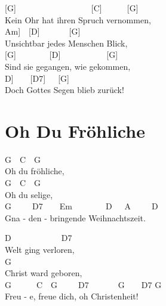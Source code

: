 \documentclass[
  letterpaper,
  twoside=false]{scrbook}
\begin{document}
{[}G{]}~~~~~~~~~~~~~~~~~~{[}C{]}~~~~~~{[}G{]}\\
Kein Ohr hat ihren Spruch vernommen,\\
\hspace*{0.333em}\hspace*{0.333em}\hspace*{0.333em}\hspace*{0.333em}\hspace*{0.333em}\hspace*{0.333em}\hspace*{0.333em}\hspace*{0.333em}\hspace*{0.333em}\hspace*{0.333em}\hspace*{0.333em}{[}Am{]}~~{[}D{]}~~~~~~~{[}G{]}\\
Unsichtbar jedes Menschen Blick,\\
{[}G{]}~~~~~~~~{[}D{]}~~~~~~~~~~~{[}G{]}\\
Sind sie gegangen, wie gekommen,\\
\hspace*{0.333em}\hspace*{0.333em}\hspace*{0.333em}\hspace*{0.333em}\hspace*{0.333em}\hspace*{0.333em}\hspace*{0.333em}\hspace*{0.333em}\hspace*{0.333em}\hspace*{0.333em}\hspace*{0.333em}\hspace*{0.333em}{[}D{]}~~~~{[}D7{]}~~~{[}G{]}\\
Doch Gottes Segen blieb zurück!

\hypertarget{oh-du-fruxf6hliche}{%
\chapter{Oh Du Fröhliche}\label{oh-du-fruxf6hliche}}

G~~C~~G\\
Oh du fröhliche,\\
G~~C~~G\\
Oh du selige,\\
G~~~~~D7~~~~Em~~~~~~~~D~~~A~~~~~D\\
Gna - den - bringende Weihnachtszeit.

D~~~~~~~~~~~~D7\\
Welt ging verloren,\\
G\\
Christ ward geboren,\\
G~~~~~~C~~G~~~~~D7~~~~~~~G~~~~D7 G\\
Freu - e, freue dich, oh Christenheit!
\end{document}
